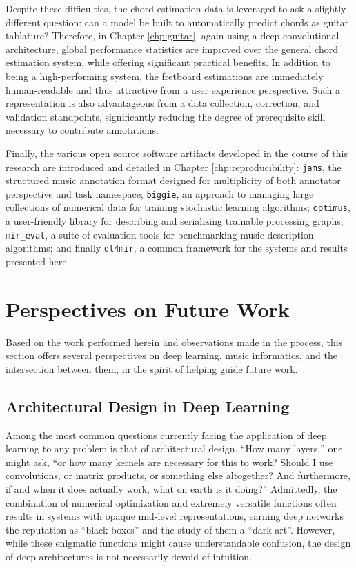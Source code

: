 Despite these difficulties, the chord estimation data is leveraged to ask a slightly different question: can a model be built to automatically predict chords as guitar tablature?
Therefore, in Chapter \ref{chp:guitar}, again using a deep convolutional architecture, global performance statistics are improved over the general chord estimation system, while offering significant practical benefits.
In addition to being a high-performing system, the fretboard estimations are immediately human-readable and thus attractive from a user experience perspective.
Such a representation is also advantageous from a data collection, correction, and validation standpoints, significantly reducing the degree of prerequisite skill necessary to contribute annotations.

Finally, the various open source software artifacts developed in the course of this research are introduced and detailed in Chapter \ref{chp:reproducibility}:
\texttt{jams}, the structured music annotation format designed for multiplicity of both annotator perspective and task namespace;
\texttt{biggie}, an approach to managing large collections of numerical data for training stochastic learning algorithms;
\texttt{optimus}, a user-friendly library for describing and serializing trainable processing graphs;
\texttt{mir\_eval}, a suite of evaluation tools for benchmarking music description algorithms;
and finally \texttt{dl4mir}, a common framework for the systems and results presented here.


\section{Perspectives on Future Work}
\label{sec:future}

Based on the work performed herein and observations made in the process, this section offers several perspectives on deep learning, music informatics, and the intersection between them, in the spirit of helping guide future work.


\subsection{Architectural Design in Deep Learning}

Among the most common questions currently facing the application of deep learning to any problem is that of architectural design.
``How many layers,'' one might ask, ``or how many kernels are necessary for this to work?
Should I use convolutions, or matrix products, or something else altogether?
And furthermore, if and when it does actually work, what on earth is it doing?''
Admittedly, the combination of numerical optimization and extremely versatile functions often results in systems with opaque mid-level representations, earning deep networks the reputation as ``black boxes'' and the study of them a ``dark art''.
However, while these enigmatic functions might cause understandable confusion, the design of deep architectures is not necessarily devoid of intuition.

